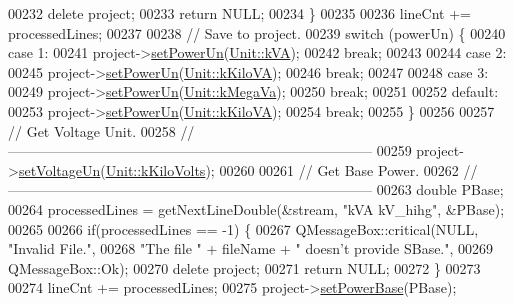 \begin{DoxyCode}
00232     \textcolor{keyword}{delete} project;
00233     \textcolor{keywordflow}{return} NULL;
00234   \}
00235 
00236   lineCnt += processedLines;
00237 
00238 \textcolor{comment}{// Save to project.}
00239   \textcolor{keywordflow}{switch} (powerUn) \{
00240   \textcolor{keywordflow}{case} 1:
00241     project->\hyperlink{class_project_aa46b8645d2047c1a2e8d329b9ebbc120}{setPowerUn}(\hyperlink{class_unit_ace265ae255370ccacfd5370337572c3ba72b181a842ae2759488a2fa1410d3696}{Unit::kVA});
00242     \textcolor{keywordflow}{break};
00243 
00244   \textcolor{keywordflow}{case} 2:
00245     project->\hyperlink{class_project_aa46b8645d2047c1a2e8d329b9ebbc120}{setPowerUn}(\hyperlink{class_unit_ace265ae255370ccacfd5370337572c3bac9e5154522fbb810d7aed75c3ff47cb2}{Unit::kKiloVA});
00246     \textcolor{keywordflow}{break};
00247 
00248   \textcolor{keywordflow}{case} 3:
00249     project->\hyperlink{class_project_aa46b8645d2047c1a2e8d329b9ebbc120}{setPowerUn}(\hyperlink{class_unit_ace265ae255370ccacfd5370337572c3ba6039da0ed20f8bee64305bab8bdec365}{Unit::kMegaVa});
00250     \textcolor{keywordflow}{break};
00251 
00252   \textcolor{keywordflow}{default}:
00253     project->\hyperlink{class_project_aa46b8645d2047c1a2e8d329b9ebbc120}{setPowerUn}(\hyperlink{class_unit_ace265ae255370ccacfd5370337572c3bac9e5154522fbb810d7aed75c3ff47cb2}{Unit::kKiloVA});
00254     \textcolor{keywordflow}{break};
00255   \}
00256 
00257 \textcolor{comment}{// Get Voltage Unit.}
00258 \textcolor{comment}{//------------------------------------------------------------------------------}
00259   project->\hyperlink{class_project_aa26b488b2e93c8a8c6b4423ce07df4a1}{setVoltageUn}(\hyperlink{class_unit_a55b07dfa9457e1eca2c7194fe0cfc3c1a35a201a658c2cd89766787c657e9a54d}{Unit::kKiloVolts});
00260 
00261 \textcolor{comment}{// Get Base Power.}
00262 \textcolor{comment}{//------------------------------------------------------------------------------}
00263   \textcolor{keywordtype}{double} PBase;
00264   processedLines = getNextLineDouble(&stream, \textcolor{stringliteral}{"kVA    kV\_hihg"}, &PBase);
00265 
00266   \textcolor{keywordflow}{if}(processedLines == -1) \{
00267     QMessageBox::critical(NULL, \textcolor{stringliteral}{"Invalid File."},
00268                           \textcolor{stringliteral}{"The file "} + fileName + \textcolor{stringliteral}{" doesn't provide SBase."},
00269                           QMessageBox::Ok);
00270     \textcolor{keyword}{delete} project;
00271     \textcolor{keywordflow}{return} NULL;
00272   \}
00273 
00274   lineCnt += processedLines;
00275   project->\hyperlink{class_project_abb4df805b3cd3af509a41e657eb4bb83}{setPowerBase}(PBase);

\end{DoxyCode}
